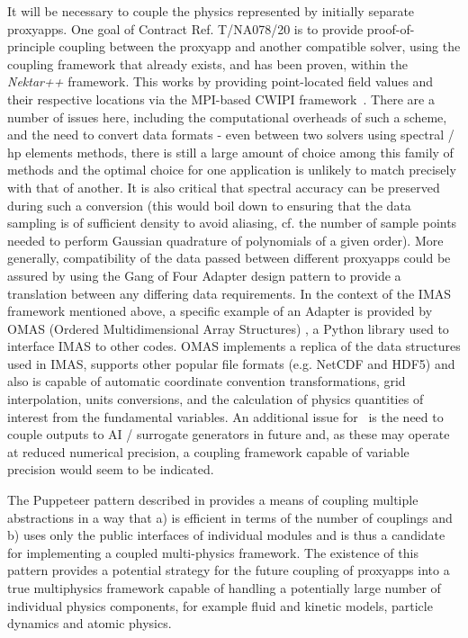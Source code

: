 It will be necessary to couple the physics represented by initially separate proxyapps.  
One goal of Contract Ref. T/NA078/20 is to provide proof-of-principle coupling between
the proxyapp and another compatible solver, using the coupling framework that
already exists, and has been proven, within the {\it Nektar++} framework.
This works by providing point-located field values and their respective
locations via the MPI-based CWIPI framework~\cite{cwipiwebsite,Ca19Test}.  
There are a number of issues here, including the computational overheads of
such a scheme, and the need to convert data formats - even between two solvers
using spectral / hp elements methods, there is still a large amount of choice
among this family of methods and the optimal choice for one application is
unlikely to match precisely with that of another.  
It is also critical that spectral accuracy can be preserved during such a
conversion (this would boil down to ensuring that the data sampling is of
sufficient density to avoid aliasing, cf. the number of sample points needed
to perform Gaussian quadrature of polynomials of a given order).  
More generally, compatibility of the data passed between different proxyapps
could be assured by using the Gang of Four Adapter design pattern to provide a
translation between any differing data requirements.  
In the context of the IMAS framework mentioned above, a specific example of an Adapter
is provided by OMAS (Ordered Multidimensional Array Structures) \cite{omaswebsite}, 
a Python library used to interface IMAS to other codes.
OMAS implements a replica of the data structures used in IMAS, supports other popular
file formats (e.g. NetCDF and HDF5) and also is capable of automatic coordinate 
convention transformations, grid interpolation, units conversions, and the calculation
of physics quantities of interest from the fundamental variables.
An additional issue for \nep\ is the need to couple outputs to AI / surrogate generators
in future and, as these may operate at reduced numerical precision, a coupling
framework capable of variable precision would seem to be indicated.


The Puppeteer pattern described in \cite{rousonxiaxu} provides a means of
coupling multiple abstractions in a way that a) is efficient in terms of the
number of couplings and b) uses only the public interfaces of individual
modules and is thus a candidate for implementing a coupled multi-physics
framework.  
The existence of this pattern provides a potential strategy for the future
coupling of proxyapps into a true multiphysics framework capable of handling a
potentially large number of individual physics components, for example fluid
and kinetic models, particle dynamics and atomic physics.
